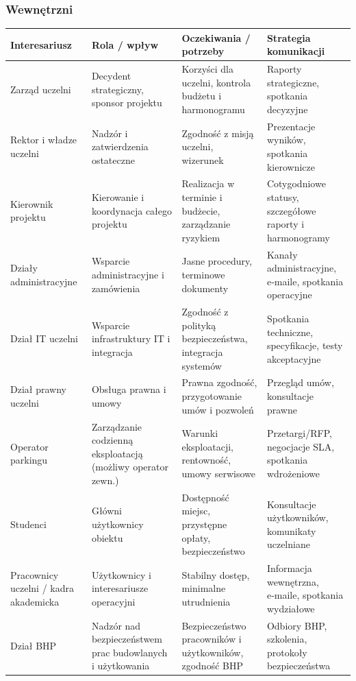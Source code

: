 \documentclass[a4paper,12pt]{article}
\begin{document}
\subsubsection*{Wewnętrzni}
\begin{center}
\begin{tabularx}{\textwidth}{X X X X}
\toprule
\textbf{Interesariusz} & \textbf{Rola / wpływ} & \textbf{Oczekiwania / potrzeby} & \textbf{Strategia komunikacji} \\
\midrule
Zarząd uczelni & Decydent strategiczny, sponsor projektu & Korzyści dla uczelni, kontrola budżetu i harmonogramu & Raporty strategiczne, spotkania decyzyjne \\
\addlinespace
Rektor i władze uczelni & Nadzór i zatwierdzenia ostateczne & Zgodność z misją uczelni, wizerunek & Prezentacje wyników, spotkania kierownicze \\
\addlinespace
Kierownik projektu & Kierowanie i koordynacja całego projektu & Realizacja w terminie i budżecie, zarządzanie ryzykiem & Cotygodniowe statusy, szczegółowe raporty i harmonogramy \\
\addlinespace
Działy administracyjne & Wsparcie administracyjne i zamówienia & Jasne procedury, terminowe dokumenty & Kanały administracyjne, e‑maile, spotkania operacyjne \\
\addlinespace
Dział IT uczelni & Wsparcie infrastruktury IT i integracja & Zgodność z polityką bezpieczeństwa, integracja systemów & Spotkania techniczne, specyfikacje, testy akceptacyjne \\
\addlinespace
Dział prawny uczelni & Obsługa prawna i umowy & Prawna zgodność, przygotowanie umów i pozwoleń & Przegląd umów, konsultacje prawne \\
\addlinespace
Operator parkingu & Zarządzanie codzienną eksploatacją (możliwy operator zewn.) & Warunki eksploatacji, rentowność, umowy serwisowe & Przetargi/RFP, negocjacje SLA, spotkania wdrożeniowe \\
\addlinespace
Studenci & Główni użytkownicy obiektu & Dostępność miejsc, przystępne opłaty, bezpieczeństwo & Konsultacje użytkowników, komunikaty uczelniane \\
\addlinespace
Pracownicy uczelni / kadra akademicka & Użytkownicy i interesariusze operacyjni & Stabilny dostęp, minimalne utrudnienia & Informacja wewnętrzna, e‑maile, spotkania wydziałowe \\
\addlinespace
Dział BHP & Nadzór nad bezpieczeństwem prac budowlanych i użytkowania & Bezpieczeństwo pracowników i użytkowników, zgodność BHP & Odbiory BHP, szkolenia, protokoły bezpieczeństwa \\
\bottomrule
\end{tabularx}
\end{center}
\end{document}
